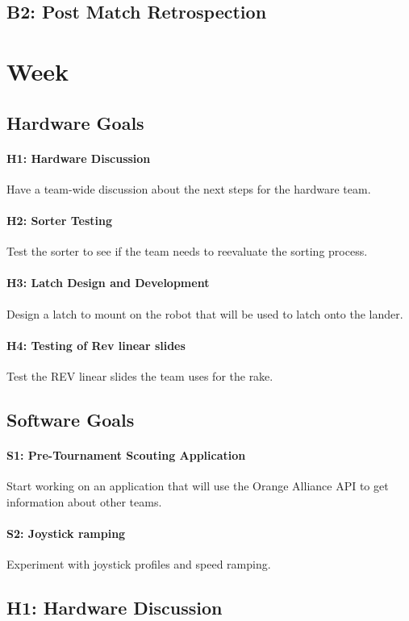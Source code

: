 \documentclass{article}
\begin{document}
\subsection{B2: Post Match Retrospection}

\clearpage \newpage \section{Week \thesection} 
\subsection{Hardware Goals}
\paragraph{H1: Hardware Discussion}
 Have a team-wide discussion about the next steps for the hardware team.
\paragraph{H2: Sorter Testing}
Test the sorter to see if the team needs to reevaluate the sorting process.
\paragraph{H3: Latch Design and Development}
 Design a latch to mount on the robot that will be used to latch onto the lander.
\paragraph{H4: Testing of Rev linear slides}
 Test the REV linear slides the team uses for the rake.
\subsection{Software Goals}
\paragraph{S1: Pre-Tournament Scouting Application}
 Start working on an application that will use the Orange Alliance API to get information about other teams. 
\paragraph{S2: Joystick ramping}
Experiment with joystick profiles and speed ramping.
\newpage
\subsection{H1: Hardware Discussion}
\end{document}
